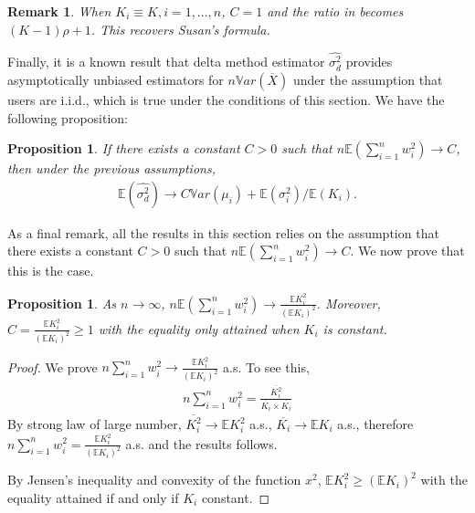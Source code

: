 \documentclass[12pt,letterpaper]{article}
\newcommand{\wht}{\widehat}
\newcommand{\var}{\ensuremath{\mathbb Var}}
\newcommand{\bbe}{\mathbb{E}}
\newcommand{\xbar}{\overline{X}}
\newcommand{\deltaest}{\wht{\sigma^2_d}}
\newtheorem{prop}[thm]{Proposition}
\newtheorem{rem}[thm]{Remark}
\begin{document}
\begin{rem}
When $K_i \equiv K, i=1,\dots, n$, $C=1$ and the ratio in \label{thm1} becomes $(K-1)\rho +1$. This recovers Susan's formula.  
\end{rem}

Finally, it is a known result that delta method estimator $\deltaest$ provides asymptotically unbiased estimators for $n\var(\xbar)$  under the assumption that users are i.i.d., which is true under the conditions of this section. We have the following proposition:
\begin{prop}\label{prop-delta}
If there exists a constant $C>0$ such that $n\bbe(\sum_{i=1}^n w_i^2)\to C$, then under the previous assumptions, 
\begin{align}
\bbe (\deltaest) \to C \var(\mu_i) + \bbe(\sigma^2_i)/\bbe (K_i) .
\end{align}
\end{prop}

As a final remark, all the results in this section relies on the assumption that there exists a constant $C>0$ such that $n\bbe(\sum_{i=1}^n w_i^2)\to C$. We now prove that this is the case.
\begin{prop}\label{prop0}
As $n\to\infty$, $n\bbe(\sum_{i=1}^n w_i^2)\to \frac{\bbe K_i^2}{(\bbe K_i)^2}$. Moreover, $C = \frac{\bbe K_i^2}{(\bbe K_i)^2} \ge 1$ with the equality only attained when $K_i$ is constant.
\end{prop}
\begin{proof}
We prove $n \sum_{i=1}^n w_i^2 \to  \frac{\bbe K_i^2}{(\bbe K_i)^2}$ a.s. To see this, 
\begin{align*}
n \sum_{i=1}^n w_i^2 =  \frac{\overline{K_i^2}}{\overline{K_i} \times \overline{K_i}}
\end{align*}
By strong law of large number, $\overline{K_i^2}\to \bbe K_i^2$ a.s., $\overline{K_i}\to \bbe K_i$ a.s., therefore $n \sum_{i=1}^n w_i^2 =  \frac{\bbe{K_i^2}}{(\bbe{K_i})^2}$ a.s. and the results follows. 

By Jensen's inequality and convexity of the function $x^2$, $\bbe K_i^2 \ge (\bbe K_i)^2$ with the equality attained if and only if $K_i$ constant. 
\end{proof}
\end{document}
